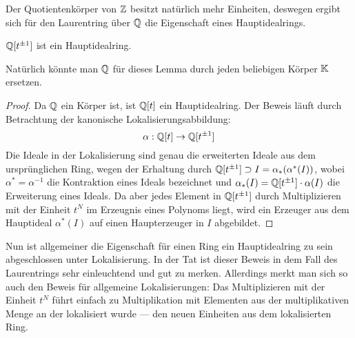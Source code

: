 Der Quotientenkörper von $\mathbb{Z}$ besitzt natürlich mehr Einheiten, deswegen ergibt sich für den Laurentring über $\mathbb{Q}$ die Eigenschaft eines Hauptidealrings.
\begin{lem}
\label{lem:QThauptidealring}
	$\mathbb{Q}[t^{\pm 1}]$ ist ein Hauptidealring.
\end{lem}
Natürlich könnte man $\mathbb{Q}$ für dieses Lemma durch jeden beliebigen Körper $\mathbb{K}$ ersetzen. 
\begin{proof}
	Da $\mathbb{Q}$ ein Körper ist, ist $\mathbb{Q}[t]$ ein Hauptidealring. Der Beweis läuft durch Betrachtung der kanonische Lokalisierungsabbildung:
	\[
		\alpha : \mathbb{Q}[t] \to \mathbb{Q}[t^{\pm 1}]
	\]
	Die Ideale in der Lokalisierung sind genau die erweiterten Ideale aus dem ursprünglichen Ring, wegen der Erhaltung durch $\mathbb{Q}[t^{\pm 1}] \supset I=\alpha_*(\alpha^*(I))$, wobei $\alpha^* = \alpha^{-1}$ die Kontraktion eines Ideals bezeichnet und $\alpha_*(I) = \mathbb{Q}[t^{\pm 1}] \cdot \alpha(I)$ die Erweiterung eines Ideals. Da aber jedes Element in $\mathbb{Q}[t^{\pm 1}]$ durch Multiplizieren mit der Einheit $t^N$ im Erzeugnis eines Polynoms liegt, wird ein Erzeuger aus dem Hauptideal $\alpha^*(I)$ auf einen Haupterzeuger in $I$ abgebildet. 
\end{proof}
 Nun ist allgemeiner die Eigenschaft für einen Ring ein Hauptidealring zu sein abgeschlossen unter Lokalisierung. In der Tat ist dieser Beweis in dem Fall des Laurentrings sehr einleuchtend und gut zu merken. Allerdings merkt man sich so auch den Beweis für allgemeine Lokalisierungen: Das Multiplizieren mit der Einheit $t^N$ führt einfach zu Multiplikation mit Elementen aus der multiplikativen Menge an der lokalisiert wurde --- den neuen Einheiten aus dem lokalisierten Ring.






